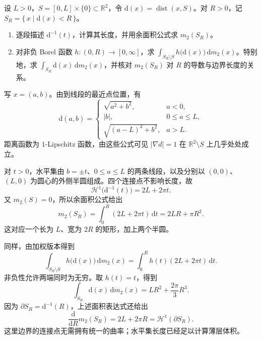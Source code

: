 \begin{exercise}\label{b1:ex:18-distance-to-segment}
设 \(L>0\)，\(S=[0,L]\times\{0\}\subset\mathbb R^2\)，令 \(\mathrm{d}(x)=\operatorname{dist}(x,S)\)。对 \(R>0\)，记 \(S_R=\{\,x\mid \mathrm{d}(x)<R\,\}\)。
\begin{enumerate}
\item\label{b1:item:18-segment-level-length}
逐段描述 \(\mathrm{d}^{-1}(t)\)，计算其长度，并用余面积公式求 \(m_2(S_R)\)。
\item\label{b1:item:18-segment-weighted-layer}
对非负 Borel 函数 \(h:(0,R)\rightarrow[0,\infty]\)，求 \(\int_{S_R\setminus S}h\bigl(\mathrm{d}(x)\bigr)\,\mathrm dm_2(x)\)。特别地，求 \(\int_{S_R}\mathrm{d}(x)\,\mathrm dm_2(x)\)，并核对 \(m_2(S_R)\) 对 \(R\) 的导数与边界长度的关系。
\end{enumerate}
\end{exercise}
\begin{solution}
写 \(x=(a,b)\)。由到线段的最近点位置，有
\[
 \mathrm{d}(a,b)=
 \begin{cases}
 \sqrt{a^2+b^2},&a<0,\\
 |b|,&0\le a\le L,\\
 \sqrt{(a-L)^2+b^2},&a>L.
 \end{cases}
\]
距离函数为 \(1\)-Lipschitz 函数，由这些公式可见 \(|\nabla d|=1\) 在 \(\mathbb R^2\setminus S\) 上几乎处处成立。

对 \(t>0\)，水平集由 \(b=\pm t\)、\(0\le a\le L\) 的两条线段，以及分别以 \((0,0)\)、\((L,0)\) 为圆心的外侧半圆组成。四个连接点不影响长度，故
\[
 \mathcal H^1\bigl(\mathrm{d}^{-1}(t)\bigr)=2L+2\pi t.
\]
又 \(m_2(S)=0\)，所以余面积公式给出
\[
 m_2(S_R)=\int_0^R(2L+2\pi t)\,\mathrm dt
 =2LR+\pi R^2.
\]
这对应一个长为 \(L\)、宽为 \(2R\) 的矩形，加上两个半圆。

同样，由加权版本得到
\[
 \int_{S_R\setminus S}h\bigl(\mathrm{d}(x)\bigr)\,\mathrm dm_2(x)
 =\int_0^Rh(t)(2L+2\pi t)\,\mathrm dt.
\]
非负性允许两端同时为无穷。取 \(h(t)=t\)，得到
\[
 \int_{S_R}\mathrm{d}(x)\,\mathrm dm_2(x)
 =LR^2+\frac{2\pi}{3}R^3.
\]
因为 \(\partial S_R=\mathrm{d}^{-1}(R)\)，上述面积表达式还给出
\[
 \frac{\mathrm d}{\mathrm dR}m_2(S_R)
 =2L+2\pi R=\mathcal H^1(\partial S_R).
\]
这里边界的连接点无需拥有统一的曲率；水平集长度已经足以计算薄层体积。
\end{solution}

